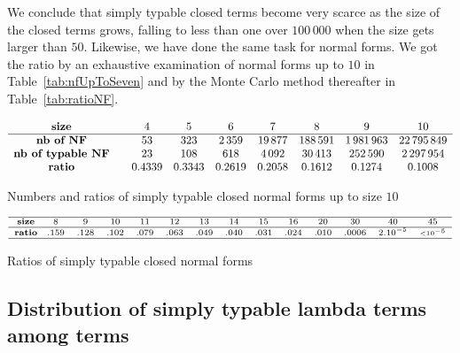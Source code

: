 \documentclass{jfp1}
\begin{document}
 We conclude that simply typable closed terms become very scarce as the size of the
 closed terms grows, falling to less than one over $100\, 000$ when the size gets
 larger than $50$.  Likewise, we have done the same task for normal forms.  We got
 the ratio by an exhaustive examination of normal forms up to $10$ in
 Table~\ref{tab:nfUpToSeven} and by the Monte Carlo method thereafter in
 Table~\ref{tab:ratioNF}.

\begin{table}[htb!]
  \centering
  \begin{displaymath}
    \begin{array}{  c @{\qquad}   c   c   c   c  c c c}
\textbf{size} & 4 & 5 & 6 & 7 & 8 & 9 & 10  \\
\hline \textbf{nb of NF} & 53&323&2\,359&19\,877&188\,591&1\,981\,963 & 22\,795\,849\\
\textbf{nb of typable NF} & 23&108&618&4\,092&30\,413&252\,590 & 2\,297\,954\\
\textbf{ratio} & 0.4339&0.3343&0.2619&0.2058 & 0.1612& 0.1274 & 0.1008\\
\end{array}
  \end{displaymath}
  \caption{Numbers and ratios of simply typable closed normal forms up to size $10$}
\label{tab:nfUpToSeven}
\end{table}
\begin{table*}[htb!]
  \centering
  \begin{math}
    \begin{scriptsize}
      \begin{array}{  c @{\quad} c   c   c   c   c   c   c   c   c   c   c   c   c   c }
        \hline
        \textbf{size} & 8 & 9 & 10 & 11 & 12 & 13 & 14 & 15 & 16 & 20 & 30 & 40 & 45  \\
        \hline
        \textbf{ratio} & .159&.128  & .102 & .079& .063 &.049& .040  &.031  &.024 &.010 &.0006& 
        2.10^{-5} &{\scriptscriptstyle < 10^{-5}}\\
        \hline
      \end{array}
    \end{scriptsize}
  \end{math}

  \caption{Ratios of simply typable closed normal forms}
\label{tab:ratioNF}
\end{table*}

\subsection{Distribution of simply typable lambda terms among terms}
\end{document}
